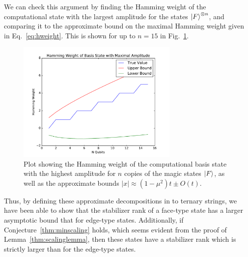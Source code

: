 \documentclass{standalone}
\begin{document}
We can check this argument by finding the Hamming weight of the computational state with the largest amplitude for the states $\ket{F}^{\otimes n}$, and comparing it to the approximate bound on the maximal Hamming weight given in Eq.~\ref{eq:hweight}. This is shown for up to $n=15$ in Fig.~\ref{fig:compbasis}.
\par
\begin{figure}[!h]
    \centering
    \includegraphics[width=0.7\textwidth]{Figures/computational_bound.pdf}
    \caption{Plot showing the Hamming weight of the computational basis state with the highest amplitude for $n$ copies of the magic states $\ket{F}$, as well as the approximate bounds $\vert x \vert \approx (1-\mu^{2})t\pm O(t)$.}
    \label{fig:compbasis}
\end{figure}
Thus, by defining these approximate decompositions in to ternary strings, we have been able to show that the stabilizer rank of a face-type state has a larger asymptotic bound that for edge-type states. Additionally, if Conjecture~\ref{thm:minscaling} holds, which seems evident from the proof of Lemma~\ref{thm:scalinglemma}, then these states have a stabilizer rank which is strictly larger than for the edge-type states.
\end{document}
